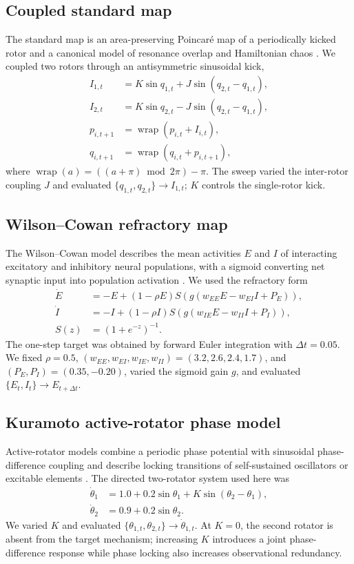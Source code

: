 \documentclass[fleqn,10pt]{wlscirep}
\begin{document}
\subsection{Coupled standard map}

The standard map is an area-preserving Poincar\'e map of a periodically kicked rotor and a canonical model of resonance overlap and Hamiltonian chaos \cite{chirikov1979universal}. We coupled two rotors through an antisymmetric sinusoidal kick,
\begin{align}
I_{1,t} &= K\sin q_{1,t}+J\sin(q_{2,t}-q_{1,t}),\\
I_{2,t} &= K\sin q_{2,t}-J\sin(q_{2,t}-q_{1,t}),\\
p_{i,t+1} &= \operatorname{wrap}(p_{i,t}+I_{i,t}),\\
q_{i,t+1} &= \operatorname{wrap}(q_{i,t}+p_{i,t+1}),
\end{align}
where $\operatorname{wrap}(a)=((a+\pi)\bmod 2\pi)-\pi$. The sweep varied the inter-rotor coupling $J$ and evaluated $\{q_{1,t},q_{2,t}\}\rightarrow I_{1,t}$; $K$ controls the single-rotor kick.

\subsection{Wilson--Cowan refractory map}

The Wilson--Cowan model describes the mean activities $E$ and $I$ of interacting excitatory and inhibitory neural populations, with a sigmoid converting net synaptic input into population activation \cite{wilson1972excitatory}. We used the refractory form
\begin{align}
\dot E &= -E+(1-\rho E)S\!\left(g(w_{EE}E-w_{EI}I+P_E)\right),\\
\dot I &= -I+(1-\rho I)S\!\left(g(w_{IE}E-w_{II}I+P_I)\right),\\
S(z) &= (1+e^{-z})^{-1}.
\end{align}
The one-step target was obtained by forward Euler integration with $\Delta t=0.05$. We fixed $\rho=0.5$, $(w_{EE},w_{EI},w_{IE},w_{II})=(3.2,2.6,2.4,1.7)$, and $(P_E,P_I)=(0.35,-0.20)$, varied the sigmoid gain $g$, and evaluated $\{E_t,I_t\}\rightarrow E_{t+\Delta t}$.

\subsection{Kuramoto active-rotator phase model}

Active-rotator models combine a periodic phase potential with sinusoidal phase-difference coupling and describe locking transitions of self-sustained oscillators or excitable elements \cite{shinomoto1986phase}. The directed two-rotator system used here was
\begin{align}
\dot\theta_1 &= 1.0+0.2\sin\theta_1+K\sin(\theta_2-\theta_1),\\
\dot\theta_2 &= 0.9+0.2\sin\theta_2.
\end{align}
We varied $K$ and evaluated $\{\theta_{1,t},\theta_{2,t}\}\rightarrow\dot\theta_{1,t}$. At $K=0$, the second rotator is absent from the target mechanism; increasing $K$ introduces a joint phase-difference response while phase locking also increases observational redundancy.
\end{document}
